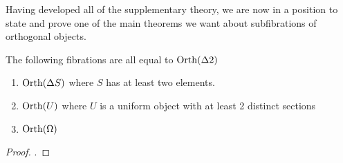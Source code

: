 Having developed all of the supplementary theory, we are now in a
position to state and prove one of the main theorems we want about
subfibrations of orthogonal objects.
\begin{thm}\label{thm:orth:allequiv}
  The following fibrations are all equal to $\operatorname{Orth}(\Delta 2)$
  \begin{enumerate}
  \item $\operatorname{Orth}(\Delta S)$ where $S$ has at least two elements.
  \item $\operatorname{Orth}(U)$ where $U$ is a uniform object with at least 2
    distinct sections
  \item $\operatorname{Orth}(\Omega)$
  \end{enumerate}
\end{thm}
\begin{proof}
  .
\end{proof}

